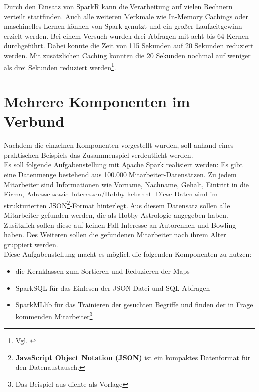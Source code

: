 \noindent
Durch den Einsatz von SparkR kann die Verarbeitung auf vielen Rechnern verteilt stattfinden. Auch alle weiteren Merkmale wie In-Memory Cachings oder maschinelles Lernen können von Spark genutzt und ein großer Laufzeitgewinn erzielt werden. Bei einem Versuch wurden drei Abfragen mit acht bis 64 Kernen durchgeführt. Dabei konnte die Zeit von 115 Sekunden auf 20 Sekunden reduziert werden. Mit zusätzlichen Caching konnten die 20 Sekunden nochmal auf weniger als drei Sekunden reduziert werden\footnote{Vgl. \cite{VYL+16}}.



\newpage
\section{Mehrere Komponenten im Verbund}\label{sec_verbund}

Nachdem die einzelnen Komponenten vorgestellt wurden, soll anhand eines praktischen Beispiels das Zusammenspiel verdeutlicht werden. \\

\noindent
Es soll folgende Aufgabenstellung mit Apache Spark realisiert werden: Es gibt eine Datenmenge bestehend aus 100.000 Mitarbeiter-Datensätzen. Zu jedem Mitarbeiter sind Informationen wie Vorname, Nachname, Gehalt, Eintritt in die Firma, Adresse sowie Interessen/Hobby bekannt. Diese Daten sind im strukturierten JSON\footnote{\textbf{JavaScript Object Notation (JSON)} ist ein kompaktes Datenformat für den Datenaustausch. }-Format hinterlegt. 
Aus diesem Datensatz sollen alle Mitarbeiter gefunden werden, die als Hobby Astrologie angegeben haben. Zusätzlich sollen diese auf keinen Fall Interesse an Autorennen und Bowling haben. Des Weiteren sollen die gefundenen Mitarbeiter nach ihrem Alter gruppiert werden. \\
Diese Aufgabenstellung macht es möglich die folgenden Komponenten zu nutzen:
\begin{itemize}
	\item die Kernklassen zum Sortieren und Reduzieren der Maps
	\item SparkSQL für das Einlesen der JSON-Datei und SQL-Abfragen
	\item SparkMLlib für das Trainieren der gesuchten Begriffe und finden der in Frage kommenden Mitarbeiter\footnote{Das Beispiel aus \cite{GITHUB_EXAMPLE} diente als Vorlage}	
\end{itemize}  

